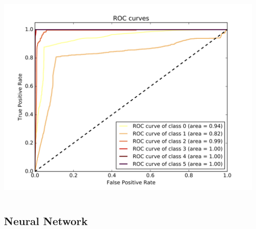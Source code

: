 \documentclass[c]{beamer}
\begin{document}
\begin{frame}
\begin{columns}
\begin{column}{0.6\textwidth}
      \centering\vfill
      \includegraphics[scale=0.18]{../../data/France/test/Support_Vector_Gaussian_Classification/Support_Vector_Gaussian_Classification_roc.png}
\end{column}
\end{columns}
\end{frame}



\subsection{Neural Network}
\begin{frame}
\tableofcontents[currentsubsection]
\end{frame}
\end{document}
